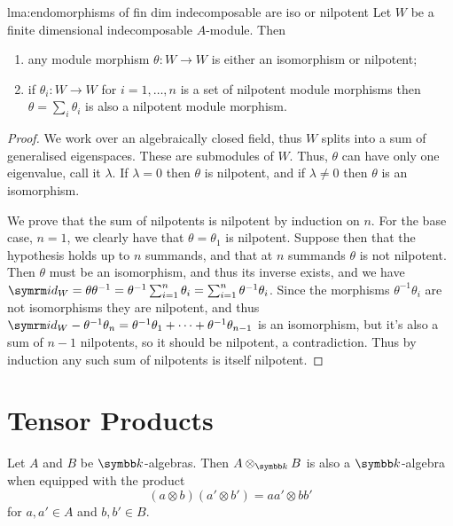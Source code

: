 \begin{lma}{}{lma:endomorphisms of fin dim indecomposable are iso or nilpotent}
    Let \(W\) be a finite dimensional indecomposable \(A\)-module.
    Then
    \begin{enumerate}
        \item any module morphism \(\theta \colon W \to W\) is either an isomorphism or nilpotent;
        \item if \(\theta_i \colon W \to W\) for \(i = 1, \dotsc, n\) is a set of nilpotent module morphisms then \(\theta = \sum_i \theta_i\) is also a nilpotent module morphism.
    \end{enumerate}
    \begin{proof}
        We work over an algebraically closed field, thus \(W\) splits into a sum of generalised eigenspaces.
        These are submodules of \(W\).
        Thus, \(\theta\) can have only one eigenvalue, call it \(\lambda\).
        If \(\lambda = 0\) then \(\theta\) is nilpotent, and if \(\lambda \ne 0\) then \(\theta\) is an isomorphism.
        
        We prove that the sum of nilpotents is nilpotent by induction on \(n\).
        For the base case, \(n = 1\), we clearly have that \(\theta = \theta_1\) is nilpotent.
        Suppose then that the hypothesis holds up to \(n\) summands, and that at \(n\) summands \(\theta\) is not nilpotent.
        Then \(\theta\) must be an isomorphism, and thus its inverse exists, and we have \(\id_W = \theta \theta^{-1} = \theta^{-1} \sum_{i=1}^n \theta_i = \sum_{i=1}^n \theta^{-1}\theta_i\).
        Since the morphisms \(\theta^{-1}\theta_i\) are not isomorphisms they are nilpotent, and thus \(\id_W - \theta^{-1}\theta_n = \theta^{-1}\theta_1 + \dotsb + \theta^{-1}\theta_{n-1}\) is an isomorphism, but it's also a sum of \(n - 1\) nilpotents, so it should be nilpotent, a contradiction.
        Thus by induction any such sum of nilpotents is itself nilpotent.
    \end{proof}
\end{lma}

\section{Tensor Products}
Let \(A\) and \(B\) be \(\field\)-algebras.
Then \(A \otimes_{\field} B\) is also a \(\field\)-algebra when equipped with the product
\begin{equation}
    (a \otimes b)(a' \otimes b') = aa' \otimes bb'
\end{equation}
for \(a, a' \in A\) and \(b, b' \in B\).

